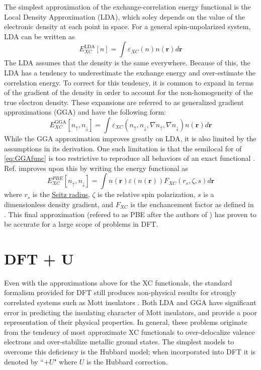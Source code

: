 \documentclass[12pt]{article}
\begin{document}
The simplest approximation of the exchange-correlation energy functional is the Local Density Approximation (LDA), which soley depends on the value of the electronic density at each point in space. For a general spin-unpolarized system, LDA can be written as 
\begin{equation*}
    E_{XC}^{\mathrm{LDA}}[n] = \int \varepsilon_{XC}(n)n(\textbf{r})d\textbf{r}
\end{equation*}
The LDA assumes that the density is the same everywhere. Because of this, the LDA has a tendency to underestimate the exchange energy and over-estimate the correlation energy. To correct for this tendency, it is common to expand in terms of the gradient of the density in order to account for the non-homogeneity of the true electron density. These expansions are referred to as generalized gradient approximations (GGA) and have the following form:
\begin{equation}\label{eq:GGAfunc}
    E_{XC}^{\mathrm{GGA}}[n_{\uparrow},n_{\downarrow}] = \int \varepsilon_{XC}(n_{\uparrow},n_{\downarrow},\nabla n_{\uparrow},\nabla n_{\downarrow})n(\textbf{r})d\textbf{r}
\end{equation}
While the GGA approximation improves greatly on LDA, it is also limited by the assumptions in its derivation. One such limitation is that the semilocal for of \eqref{eq:GGAfunc} is too restrictive to reproduce all behaviors of an exact functional \cite{PBE2}. Ref. \cite{PBE} improves upon this by writing the energy functional as 
\begin{equation}\label{eq:PBEfunc}
    E^{PBE}_{XC}[n_{\uparrow},n_{\downarrow}] = \int n(\textbf{r})\varepsilon(n(\textbf{r}))F_{XC}(r_s,\zeta,s) d\textbf{r}
\end{equation}
where $r_s$ is the \href{https://en.wikipedia.org/wiki/Wigner\%E2\%80\%93Seitz_radius}{Seitz radius}, $\zeta$ is the relative spin polarization, $s$ is a dimensionless density gradient, and $F_{XC}$ is the enchancement factor as defined in \cite{PBEfxc}. This final approximation (refered to as PBE after the authors of \cite{PBE}) has proven to be accurate for a large scope of problems in DFT. 
\section{DFT + U} %

Even with the approximations above for the XC functionals, the standard formalism provided for DFT still produces non-physical results for strongly correlated systems such as Mott insulators \cite{DFT+Ubook}. Both LDA and GGA have significant error in predicting the insulating character of Mott insulators, and provide a poor representation of their physical properties.  In general, these problems originate from the tendency of most approximate XC functionals to over-delocalize valence electrons and over-stabilize metallic ground states. The simplest models to overcome this deficiency is the Hubbard model; when incorporated into DFT it is denoted by ``$+U$" where $U$ is the Hubbard correction.
\end{document}
